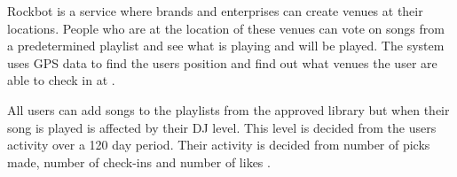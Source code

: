Rockbot is a service where brands and enterprises can create venues at their locations. People who are at the location of these venues can vote on songs from a predetermined playlist and see what is playing and will be played. The system uses GPS data to find the users position and find out what venues the user are able to check in at \cite{rockbotFeatures}.

All users can add songs to the playlists from the approved library but when their song is played is affected by their DJ level. This level is decided from the users activity over a 120 day period. Their activity is decided from number of picks made, number of check-ins and number of likes \cite{rockbotBlog}.